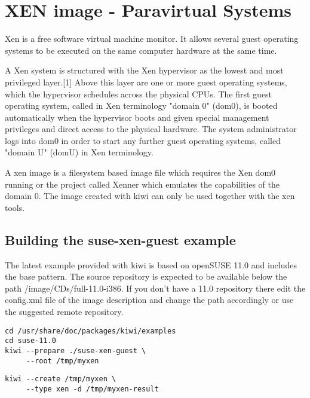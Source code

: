 \chapter{XEN image - Paravirtual Systems}
\label{chapter:xen}
\minitoc

Xen is a free software virtual machine monitor. It allows several
guest operating systems to be executed on the same computer hardware
at the same time.

A Xen system is structured with the Xen hypervisor as the lowest and
most privileged layer.[1] Above this layer are one or more guest
operating systems, which the hypervisor schedules across the physical
CPUs. The first guest operating system, called in Xen terminology
"domain 0" (dom0), is booted automatically when the hypervisor boots
and given special management privileges and direct access to the physical
hardware. The system administrator logs into dom0 in order to start
any further guest operating systems, called "domain U" (domU) in
Xen terminology.

A xen image is a filesystem based image file which requires the
Xen dom0 running or the project called Xenner which emulates
the capabilities of the domain 0. The image created with kiwi
can only be used together with the xen tools.

\section{Building the suse-xen-guest example}

The latest example provided with kiwi is based on openSUSE 11.0 and includes
the base pattern. The source repository is expected to be
available below the path /image/CDs/full-11.0-i386. If you don't have
a 11.0 repository there edit the config.xml file of the image description
and change the path accordingly or use the suggested remote repository.

\begin{Command}{12cm}
\begin{verbatim}
cd /usr/share/doc/packages/kiwi/examples
cd suse-11.0
kiwi --prepare ./suse-xen-guest \
     --root /tmp/myxen
\end{verbatim}
\end{Command}

\begin{Command}{12cm}
\begin{verbatim}
kiwi --create /tmp/myxen \
     --type xen -d /tmp/myxen-result
\end{verbatim}
\end{Command}

